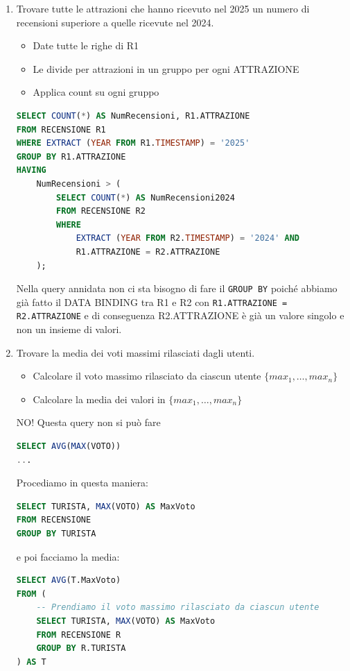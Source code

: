 \documentclass[a4paper]{article}
\begin{document}
\begin{Example}{}{}
\begin{enumerate}
\begin{Observation}
Questa query non richiede che gli schemi siano compatibili,e permette di
aggiungere facilmente altri attributi alla query esterna
\end{Observation}
    \item Trovare tutte le attrazioni che hanno ricevuto nel 2025 un numero di recensioni
    superiore a quelle ricevute nel 2024.
    \begin{itemize}
        \item Date tutte le righe di R1
        \item Le divide per attrazioni in un gruppo per ogni ATTRAZIONE
        \item Applica count su ogni gruppo
    \end{itemize}
\begin{lstlisting}[language=SQL]
SELECT COUNT(*) AS NumRecensioni, R1.ATTRAZIONE
FROM RECENSIONE R1
WHERE EXTRACT (YEAR FROM R1.TIMESTAMP) = '2025'
GROUP BY R1.ATTRAZIONE
HAVING
    NumRecensioni > (
        SELECT COUNT(*) AS NumRecensioni2024
        FROM RECENSIONE R2
        WHERE
            EXTRACT (YEAR FROM R2.TIMESTAMP) = '2024' AND
            R1.ATTRAZIONE = R2.ATTRAZIONE
    );
\end{lstlisting}
Nella query annidata non ci sta bisogno di fare il \texttt{GROUP BY}
poiché abbiamo già fatto il DATA BINDING tra R1 e R2 con
\texttt{R1.ATTRAZIONE = R2.ATTRAZIONE} e di conseguenza
R2.ATTRAZIONE è già un valore singolo e non un insieme di valori.
    \item Trovare la media dei voti massimi rilasciati dagli utenti.
    \begin{itemize}
        \item Calcolare il voto massimo rilasciato da ciascun utente $\{max_1, \dots, max_n\}$
        \item Calcolare la media dei valori in $\{max_1, \dots, max_n\}$
    \end{itemize}
    \begin{Warning}{}{}
        NO! Questa query non si può fare
\begin{lstlisting}[language=SQL]
SELECT AVG(MAX(VOTO))
...
\end{lstlisting}
    \end{Warning}
\noindent
Procediamo in questa maniera:
\begin{lstlisting}[language=SQL]
SELECT TURISTA, MAX(VOTO) AS MaxVoto
FROM RECENSIONE
GROUP BY TURISTA
\end{lstlisting}
\noindent
e poi facciamo la media:
\begin{lstlisting}[language=SQL]
SELECT AVG(T.MaxVoto)
FROM (
    -- Prendiamo il voto massimo rilasciato da ciascun utente
    SELECT TURISTA, MAX(VOTO) AS MaxVoto
    FROM RECENSIONE R
    GROUP BY R.TURISTA
) AS T
\end{lstlisting}
    \end{enumerate}
\end{Example}
\end{document}
